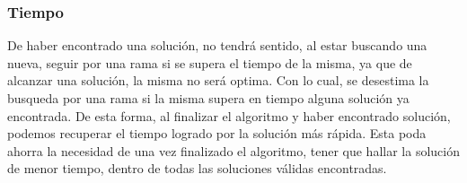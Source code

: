 \subsubsection*{Tiempo}
De haber encontrado una solución, no tendrá sentido, al estar buscando una nueva, seguir por una rama si se supera el tiempo de la misma, ya que de alcanzar una solución, la misma no será optima. Con lo cual, se desestima la busqueda por una rama si la misma supera en tiempo alguna solución ya encontrada. De esta forma, al finalizar el algoritmo y haber encontrado solución, podemos recuperar el tiempo logrado por la solución más rápida. Esta poda ahorra la necesidad de una vez finalizado el algoritmo, tener que hallar la soluci\'on de menor tiempo, dentro de todas las soluciones válidas encontradas.

